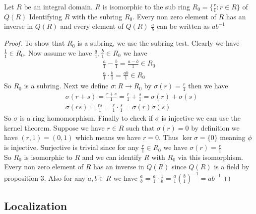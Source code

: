 \documentclass[16pt,a4paper]{article}
\theoremstyle{definition}
\begin{document}
\begin{thm}{}{}
Let $R$ be an integral domain. $R$ is isomorphic to the sub ring $R_0 = \{\frac r 1 : r \in R\}$ of $Q(R)$ Identifying $R$ with the subring $R_0$. Every non zero element of $R$ has an inverse in $Q(R)$ and every element of $Q(R)$ $\frac a b$ can be written as $ab^{-1}$
\end{thm}
\begin{proof}
To show that $R_0$ is a subring, we use the subring test. Clearly we have $\frac 1 1 \in R_0$. Now assume we have $\frac{a}{1}, \frac{b}{1}\in R_0$ we have 
\begin{align*}
\frac{a}{1}-\frac{b}{1} = \frac{a-b}{1} \in R_0 \\
\frac{a}{1}\cdot \frac{b}{1} = \frac{ab}{1} \in R_0
\end{align*}
So $R_0$ is a subring. Next we define $\sigma : R\rightarrow R_0$ by $\sigma(r) = \frac{r}{1}$ then we have 
\begin{align*}
& \sigma(r+s) = \frac{r+s}{1} = \frac{r}{1} + \frac{s}{1} = \sigma(r) + \sigma(s) \\
& \sigma(rs) =\frac{rs}{1} = \frac{r}{1}\cdot \frac{s}{1} = \sigma(r)\sigma(s)
\end{align*}
So $\sigma$ is a ring homomorphism. Finally to check if $\sigma$ is injective we can use the kernel theorem. Suppose we have $r\in R$ such that $\sigma(r) = 0$ by definition we have $(r,1) = (0,1)$ which means we have $r=0$. Thus $\ker \sigma = \{0\}$ meaning $\phi$ is injective. Surjective is trivial since for any $\frac{r}{1}\in R_0$ we have $\sigma(r) = \frac{r}{1}$
\\
So $R_0$ is isomorphic to $R$ and we can identify $R$ with $R_0$ via this isomorphism. Every non zero element of $R$ has an inverse in $Q(R)$ since $Q(R)$ is a field by proposition 3. Also for any $a,b \in R$ we have $\frac{a}{b} = \frac{a}{1}\cdot \frac{1}{b} = \frac{a}{1}\left(\frac{b}{1}\right)^{-1} = ab^{-1}$
\end{proof}
\newpage
\subsection{Localization}
\end{document}
